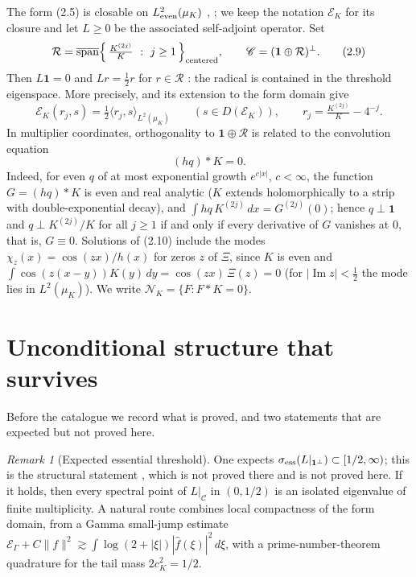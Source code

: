 \documentclass[11pt]{amsart}
\theoremstyle{definition}
\theoremstyle{remark}
\newtheorem{remark}[theorem]{Remark}
\newcommand{\dd}{\,d}
\newcommand{\XiR}{\Xi}
\newcommand{\EK}{\mathscr E_K}
\newcommand{\NK}{\mathcal N_K}
\begin{document}
The form (2.5) is closable on \(L^2_{\rm even}(\mu_K)\)
\cite[Section~23]{TrejoPizzo39}, \cite{FukushimaOshimaTakeda}; we keep the
notation \(\EK\) for its closure and let \(L\ge0\) be the associated
self-adjoint operator.  Set
\[
 \mathcal R=\overline{\operatorname{span}}
 \Bigl\{\,\tfrac{K^{(2j)}}{K}\ :\ j\ge1\,\Bigr\}_{\rm centered},
 \qquad
 \mathscr C=(\mathbf 1\oplus\mathcal R)^\perp .
\tag{2.9}
\]
Then \(L\mathbf 1=0\) and \(Lr=\frac12r\) for \(r\in\mathcal R\)
\cite[Proposition~23.3]{TrejoPizzo39}: the radical is contained in the
threshold eigenspace.  More precisely, \cite[(23.11)]{TrejoPizzo39} and
its extension to the form domain give
\[
 \EK(r_j,s)=\tfrac12\langle r_j,s\rangle_{L^2(\mu_K)}
 \qquad(s\in D(\EK)),\qquad r_j=\tfrac{K^{(2j)}}{K}-4^{-j}.
\tag{2.9a}
\]
In multiplier coordinates, orthogonality to \(\mathbf 1\oplus\mathcal R\)
is related to the convolution equation
\[
 (hq)*K=0 .
\tag{2.10}
\]
Indeed, for even \(q\) of at most exponential growth \(e^{c|x|}\),
\(c<\infty\), the function \(G=(hq)*K\) is even and real analytic
(\(K\) extends holomorphically to a strip with double-exponential decay),
and \(\int hq\,K^{(2j)}\dd x=G^{(2j)}(0)\); hence \(q\perp\mathbf 1\) and
\(q\perp K^{(2j)}/K\) for all \(j\ge1\) if and only if every derivative of
\(G\) vanishes at \(0\), that is, \(G\equiv0\).  Solutions of (2.10)
include the modes \(\chi_z(x)=\cos(zx)/h(x)\) for zeros \(z\) of
\(\XiR\), since \(K\) is even and
\(\int\cos(z(x-y))K(y)\dd y=\cos(zx)\,\XiR(z)=0\) (for
\(|\operatorname{Im}z|<\frac12\) the mode lies in \(L^2(\mu_K)\)).  We
write
\(\NK=\{F:F*K=0\}\).

\section{Unconditional structure that survives}
\label{sec:positive}

Before the catalogue we record what is proved, and two statements that are
expected but not proved here.

\begin{remark}[Expected essential threshold]
\label{thm:ess}
One expects \(\sigma_{\rm ess}(L|_{\mathbf 1^\perp})\subset[1/2,\infty)\);
this is the structural statement \cite[(23.12)]{TrejoPizzo39}, which is
not proved there and is not proved here.  If it holds, then every spectral
point of \(L|_{\mathscr C}\) in \((0,1/2)\) is an isolated eigenvalue of
finite multiplicity.  A natural route combines local compactness of the
form domain, from a Gamma small-jump estimate
\(\mathscr E_\Gamma+C\|f\|^2\gtrsim\int\log(2+|\xi|)|\widehat f(\xi)|^2\dd\xi\),
with a prime-number-theorem quadrature for the tail mass
\(2c_K^2=1/2\).
\end{remark}
\end{document}
